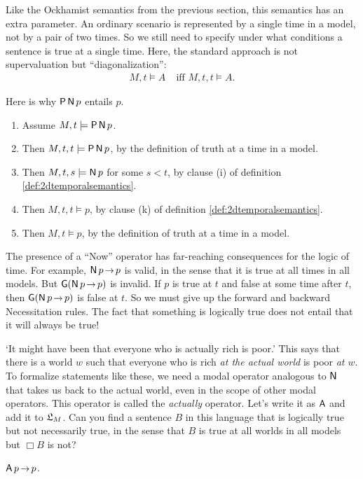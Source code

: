 Like the Ockhamist semantics from the previous section, this semantics has an
extra parameter. An ordinary scenario is represented by a single time in a
model, not by a pair of two times. So we still need to specify under what
conditions a sentence is true at a single time. Here, the standard approach is
not supervaluation but ``diagonalization'':
\begin{align*}
  M,t \models A & \;\text{iff $M,t,t \models A$}.
\end{align*}

Here is why $\operatorname{\mathsf{P}}\operatorname{\mathsf{N}} p$ entails $p$.
\begin{enumerate}[leftmargin=10mm]
  \itemsep-1mm
\item Assume $M,t \models \operatorname{\mathsf{P}}\operatorname{\mathsf{N}} p$.
\item Then $M,t,t \models \operatorname{\mathsf{P}}\operatorname{\mathsf{N}} p$, by the definition of truth at a time in a model.
\item Then $M,t,s \models \operatorname{\mathsf{N}} p$ for some $s<t$, by clause (i) of definition \ref{def:2dtemporalsemantics}.
\item Then $M,t,t \models p$, by clause (k) of definition \ref{def:2dtemporalsemantics}.
\item Then $M,t \models p$, by the definition of truth at a time in a model.
\end{enumerate}

The presence of a ``Now'' operator has far-reaching consequences for the logic
of time. For example, $\tN p \to p$ is valid, in the sense that it is true at
all times in all models. But $\tG(\tN p \to p)$ is invalid. If $p$ is true at
$t$ and false at some time after $t$, then $\tG(\tN p \to p)$ is false at $t$.
So we must give up the forward and backward Necessitation rules. The fact that
something is logically true does not entail that it will always be true!

\begin{exercise}
  `It might have been that everyone who is actually rich is poor.' This says
  that there is a world $w$ such that everyone who is rich \emph{at the actual
    world} is poor \emph{at $w$}. To formalize statements like these, we need a
  modal operator analogous to $\operatorname{\mathsf{N}}$ that takes us back to the actual world, even
  in the scope of other modal operators. This operator is called the
  \emph{actually} operator. Let's write it as $\operatorname{\mathsf{A}}$ and add it to $\mathfrak{L}_{M}$. Can
  you find a sentence $B$ in this language that is logically true but not
  necessarily true, in the sense that $B$ is true at all worlds in all models
  but $\Box B$ is not?
\end{exercise}
\begin{solution}
  $\tA p \to p$.
\end{solution}

